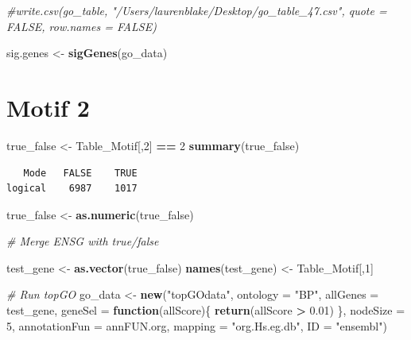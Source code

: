 \documentclass[]{article}
\newenvironment{Shaded}{\begin{snugshade}}{\end{snugshade}}
\newcommand{\KeywordTok}[1]{\textcolor[rgb]{0.13,0.29,0.53}{\textbf{#1}}}
\newcommand{\DataTypeTok}[1]{\textcolor[rgb]{0.13,0.29,0.53}{#1}}
\newcommand{\DecValTok}[1]{\textcolor[rgb]{0.00,0.00,0.81}{#1}}
\newcommand{\FloatTok}[1]{\textcolor[rgb]{0.00,0.00,0.81}{#1}}
\newcommand{\StringTok}[1]{\textcolor[rgb]{0.31,0.60,0.02}{#1}}
\newcommand{\CommentTok}[1]{\textcolor[rgb]{0.56,0.35,0.01}{\textit{#1}}}
\newcommand{\ControlFlowTok}[1]{\textcolor[rgb]{0.13,0.29,0.53}{\textbf{#1}}}
\newcommand{\OperatorTok}[1]{\textcolor[rgb]{0.81,0.36,0.00}{\textbf{#1}}}
\newcommand{\NormalTok}[1]{#1}
\begin{document}
\begin{Shaded}
\begin{Highlighting}[]
\CommentTok{#write.csv(go_table, "/Users/laurenblake/Desktop/go_table_47.csv", quote = FALSE, row.names = FALSE)}

\NormalTok{sig.genes <-}\StringTok{ }\KeywordTok{sigGenes}\NormalTok{(go_data)}
\end{Highlighting}
\end{Shaded}

\section{Motif 2}\label{motif-2}

\begin{Shaded}
\begin{Highlighting}[]
\NormalTok{true_false <-}\StringTok{ }\NormalTok{Table_Motif[,}\DecValTok{2}\NormalTok{] }\OperatorTok{==}\StringTok{ }\DecValTok{2}
\KeywordTok{summary}\NormalTok{(true_false)}
\end{Highlighting}
\end{Shaded}

\begin{verbatim}
   Mode   FALSE    TRUE 
logical    6987    1017 
\end{verbatim}

\begin{Shaded}
\begin{Highlighting}[]
\NormalTok{true_false <-}\StringTok{ }\KeywordTok{as.numeric}\NormalTok{(true_false)}


\CommentTok{# Merge ENSG with true/false}

\NormalTok{test_gene <-}\StringTok{ }\KeywordTok{as.vector}\NormalTok{(true_false)}
\KeywordTok{names}\NormalTok{(test_gene) <-}\StringTok{ }\NormalTok{Table_Motif[,}\DecValTok{1}\NormalTok{]}

\CommentTok{# Run topGO}
\NormalTok{go_data <-}\StringTok{ }\KeywordTok{new}\NormalTok{(}\StringTok{"topGOdata"}\NormalTok{,}
                   \DataTypeTok{ontology =} \StringTok{"BP"}\NormalTok{,}
                   \DataTypeTok{allGenes =}\NormalTok{ test_gene, }
                    \DataTypeTok{geneSel =} \ControlFlowTok{function}\NormalTok{(allScore)\{}
    \KeywordTok{return}\NormalTok{(allScore }\OperatorTok{>}\StringTok{ }\FloatTok{0.01}\NormalTok{)}
\NormalTok{\},}
                   \DataTypeTok{nodeSize =} \DecValTok{5}\NormalTok{,}
                   \DataTypeTok{annotationFun =}\NormalTok{ annFUN.org,}
                   \DataTypeTok{mapping =} \StringTok{"org.Hs.eg.db"}\NormalTok{,}
                   \DataTypeTok{ID =} \StringTok{"ensembl"}\NormalTok{)}
\end{Highlighting}
\end{Shaded}
\end{document}
